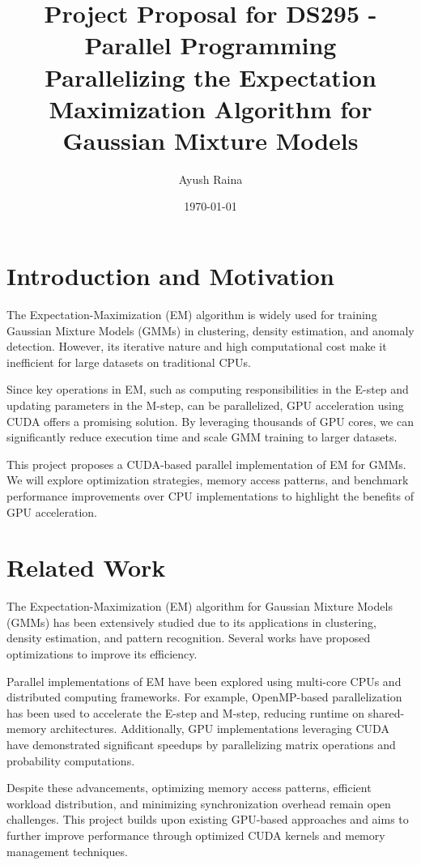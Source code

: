 \documentclass{article}
\title{Project Proposal for DS295 - Parallel Programming \\ Parallelizing the Expectation Maximization Algorithm for Gaussian Mixture Models}
\author{Ayush Raina}
\date{\today}
\begin{document}
\maketitle

\section{Introduction and Motivation}
The Expectation-Maximization (EM) algorithm is widely used for training Gaussian Mixture Models (GMMs) in clustering, density estimation, and anomaly detection. However, its iterative nature and high computational cost make it inefficient for large datasets on traditional CPUs.

Since key operations in EM, such as computing responsibilities in the E-step and updating parameters in the M-step, can be parallelized, GPU acceleration using CUDA offers a promising solution. By leveraging thousands of GPU cores, we can significantly reduce execution time and scale GMM training to larger datasets.

This project proposes a CUDA-based parallel implementation of EM for GMMs. We will explore optimization strategies, memory access patterns, and benchmark performance improvements over CPU implementations to highlight the benefits of GPU acceleration.


\section{Related Work}
The Expectation-Maximization (EM) algorithm for Gaussian Mixture Models (GMMs) has been extensively studied due to its applications in clustering, density estimation, and pattern recognition. Several works have proposed optimizations to improve its efficiency.

Parallel implementations of EM have been explored using multi-core CPUs and distributed computing frameworks. For example, OpenMP-based parallelization has been used to accelerate the E-step and M-step, reducing runtime on shared-memory architectures. Additionally, GPU implementations leveraging CUDA have demonstrated significant speedups by parallelizing matrix operations and probability computations.

Despite these advancements, optimizing memory access patterns, efficient workload distribution, and minimizing synchronization overhead remain open challenges. This project builds upon existing GPU-based approaches and aims to further improve performance through optimized CUDA kernels and memory management techniques.
\end{document}
